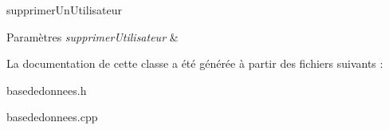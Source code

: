 supprimer\+Un\+Utilisateur 


\begin{DoxyParams}{Paramètres}
{\em supprimer\+Utilisateur} & \\
\hline
\end{DoxyParams}


La documentation de cette classe a été générée à partir des fichiers suivants \+:\begin{DoxyCompactItemize}
\item 
basededonnees.\+h\item 
basededonnees.\+cpp\end{DoxyCompactItemize}
